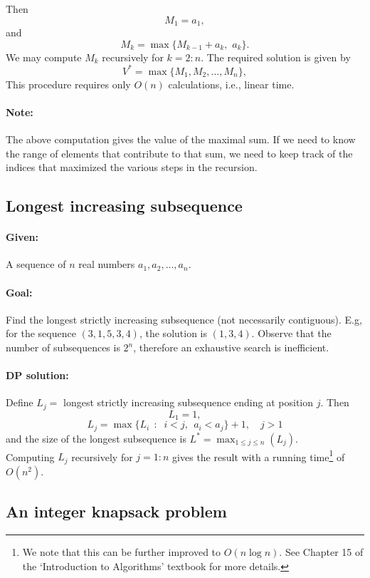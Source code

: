 Then $${M_1} = {a_1},$$ and
$${M_k} = \max \{ {M_{k - 1}} + {a_k},\,\,{a_k}\} .$$
We may compute ${M_k}$ recursively for $k = 2:n$. The required solution is given by
$${V^*} = \max \{ {M_1},{M_2}, \ldots ,{M_n}\} ,$$
This procedure requires only $O(n)$ calculations, i.e., linear time.

\paragraph{Note:}  The above computation gives the value of the maximal sum. If we need to know the range of elements that contribute to that sum, we need to keep track of the indices that maximized the various steps in the recursion.

\subsection{Longest increasing subsequence}

\paragraph{Given:}   A sequence of $n$ real numbers ${a_1},{a_2}, \ldots ,{a_n}$.
\paragraph{Goal:}   Find the longest strictly increasing subsequence (not necessarily contiguous).
E.g, for the sequence $(3,1,5,3,4)$, the solution is $(1,3,4)$.
Observe that the number of subsequences is ${2^n}$, therefore an exhaustive search is inefficient.

\paragraph{DP solution:}
Define  ${L_j} = $ {longest strictly increasing subsequence ending at position $j$}.
Then $${L_1} = 1,$$
$${L_j} = \max \{ {L_i}\,\;:\;\;i < j,\;\,{a_i} < {a_j}\}  + 1,\quad   j > 1$$
and the size of the longest subsequence is $L^* = {\max _{1 \le j \le n}}({L_j}).$
\\
Computing ${L_j}$ recursively for $j = 1:n$ gives the result with a running time\footnote{We note that this can be further improved to $O(n\log n)$. See Chapter 15 of
the `Introduction to Algorithms' textbook for more details.} of $O({n^2})$.


\subsection{An integer knapsack problem}

